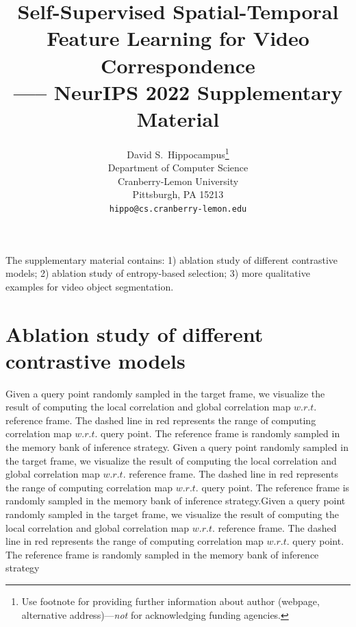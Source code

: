 \documentclass{article}
\title{Self-Supervised Spatial-Temporal Feature Learning for Video Correspondence \\
----- NeurIPS 2022 Supplementary Material}
\author{%
  David S.~Hippocampus\thanks{Use footnote for providing further information
    about author (webpage, alternative address)---\emph{not} for acknowledging
    funding agencies.} \\
  Department of Computer Science\\
  Cranberry-Lemon University\\
  Pittsburgh, PA 15213 \\
  \texttt{hippo@cs.cranberry-lemon.edu} \\
}
\begin{document}
\maketitle

The supplementary material contains:  1) ablation study of different contrastive models; 2) ablation study of entropy-based selection;  3) more qualitative examples for video object segmentation.

\section{Ablation study of different contrastive models}
Given a query point randomly sampled in the target frame, we visualize the result of computing the local correlation and global correlation map $w.r.t.$ reference frame. The dashed line in red represents the range of computing correlation map $w.r.t.$ query point. The reference frame is randomly sampled in the memory  bank of inference strategy. Given a query point randomly sampled in the target frame, we visualize the result of computing the local correlation and global correlation map $w.r.t.$ reference frame. The dashed line in red represents the range of computing correlation map $w.r.t.$ query point. The reference frame is randomly sampled in the memory  bank of inference strategy.Given a query point randomly sampled in the target frame, we visualize the result of computing the local correlation and global correlation map $w.r.t.$ reference frame. The dashed line in red represents the range of computing correlation map $w.r.t.$ query point. The reference frame is randomly sampled in the memory  bank of inference strategy
\end{document}
